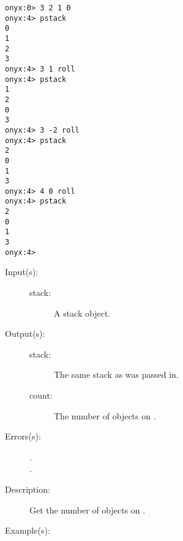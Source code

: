 \begin{description}
\begin{description}
\begin{verbatim}
onyx:0> 3 2 1 0 
onyx:4> pstack
0
1
2
3
onyx:4> 3 1 roll
onyx:4> pstack
1
2
0
3
onyx:4> 3 -2 roll
onyx:4> pstack
2
0
1
3
onyx:4> 4 0 roll
onyx:4> pstack
2
0
1
3
onyx:4>
		\end{verbatim}
	\end{description}
\label{systemdict:scount}
\item[{\onyxop{stack}{scount}{stack count}}: ]
	\begin{description}\item[]
	\item[Input(s): ]
		\begin{description}\item[]
		\item[stack: ]
			A stack object.
		\end{description}
	\item[Output(s): ]
		\begin{description}\item[]
		\item[stack: ]
			The same stack as was passed in.
		\item[count: ]
			The number of objects on .
		\end{description}
	\item[Errors(s): ]
		\begin{description}\item[]
		\item[.]
		\item[.]
		\end{description}
	\item[Description: ]
		Get the number of objects on .
	\item[Example(s): ]\begin{verbatim}


\end{verbatim}
\end{description}
\end{description}
